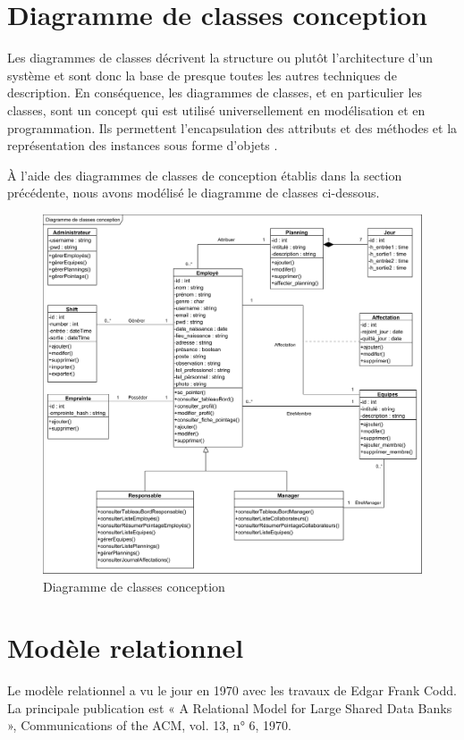 \section{Diagramme de classes conception}
Les diagrammes de classes décrivent la structure ou plutôt l’architecture d’un
système et sont donc la base de presque toutes les autres techniques de
description. En conséquence, les diagrammes de classes, et en particulier les
classes, sont un concept qui est utilisé universellement en modélisation et en
programmation. Ils permettent l’encapsulation des attributs et des méthodes et
la représentation des instances sous forme d’objets \cite{10}.

À l’aide des diagrammes de classes de conception établis dans la section
précédente, nous avons modélisé le diagramme de classes ci-dessous.

\begin{figure}[h!]
    \centering
    \includegraphics[scale=0.69]{images/DCC/Diagramme de classe.png}
    \caption{Diagramme de classes conception}
    \label{fig47}
\end{figure}

\section{Modèle relationnel}
Le modèle relationnel a vu le jour en 1970 avec les travaux de Edgar Frank 
Codd. La principale publication est « A Relational Model for Large Shared Data 
Banks », Communications of the ACM, vol. 13, n° 6, 1970.\\

